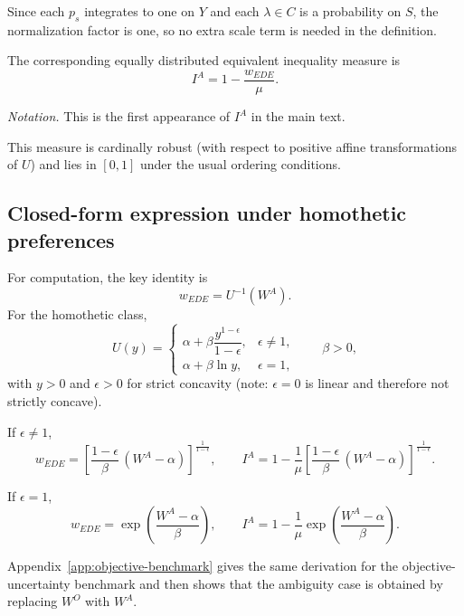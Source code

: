\documentclass[Chp3.tex]{subfiles}
\begin{document}
\par Since each $p_s$ integrates to one on $Y$ and each $\lambda\in C$ is a probability on $S$, the normalization factor is one, so no extra scale term is needed in the definition.

\par The corresponding equally distributed equivalent inequality measure is
\[
I^{A} = 1 - \frac{w_{EDE}}{\mu}.
\]

\par \textit{Notation.} This is the first appearance of $I^{A}$ in the main text.

\par This measure is cardinally robust (with respect to positive affine transformations of $U$) and lies in $[0,1]$ under the usual ordering conditions.

\subsection{Closed-form expression under homothetic preferences}

\par For computation, the key identity is
\[
w_{EDE} = U^{-1}(W^{A}).
\]
For the homothetic class,
\[
U(y)=
\begin{cases}
\alpha + \beta\dfrac{y^{1-\epsilon}}{1-\epsilon}, & \epsilon\neq 1,\\
\alpha + \beta\ln y, & \epsilon = 1,
\end{cases}
\qquad \beta>0,
\]
with $y>0$ and $\epsilon>0$ for strict concavity (note: $\epsilon=0$ is linear and therefore not strictly concave).

\par If $\epsilon\neq 1$,
\[
w_{EDE} = \left[\frac{1-\epsilon}{\beta}\,(W^{A}-\alpha)\right]^{\frac{1}{1-\epsilon}},
\qquad
I^{A} = 1 - \frac{1}{\mu}\left[\frac{1-\epsilon}{\beta}\,(W^{A}-\alpha)\right]^{\frac{1}{1-\epsilon}}.
\]

\par If $\epsilon=1$,
\[
w_{EDE} = \exp\!\left(\frac{W^{A}-\alpha}{\beta}\right),
\qquad
I^{A} = 1 - \frac{1}{\mu}\exp\!\left(\frac{W^{A}-\alpha}{\beta}\right).
\]

\par Appendix~\ref{app:objective-benchmark} gives the same derivation for the objective-uncertainty benchmark and then shows that the ambiguity case is obtained by replacing $W^{O}$ with $W^{A}$.
\end{document}
